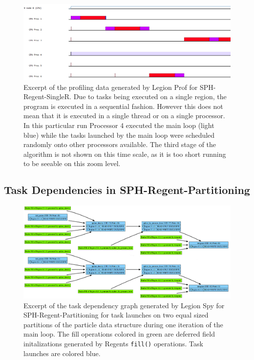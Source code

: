 \documentclass{article}      %
\begin{document}
\begin{appendices}
\begin{landscape}
			\begin{figure}[H]
				\includegraphics[width=0.95\linewidth]{images/SPH-Regent-Partitioning-Prof}
				\caption*{Excerpt of the profiling data generated by Legion Prof for SPH-Regent-SingleR. Due to tasks being executed on a single region, the program is executed in a sequential fashion. However this does not mean that it is executed in a single thread or on a single processor. In this particular run Processor 4 executed the main loop (light blue) while the tasks launched by the main loop were scheduled randomly onto other processors available. The third stage of the algorithm is not shown on this time scale, as it is too short running to be seeable on this zoom level.}
			\end{figure}

		\end{landscape}

		\newpage

		\begin{landscape}
			\section{Task Dependencies in SPH-Regent-Partitioning}
			\label{app:SPH-Regent-Partitioning-SPY}
			\pagestyle{empty}%

			\begin{figure}[H]
				\includegraphics[width=0.95\linewidth]{images/SPH-Regent-Partitioning_SPY}
				\caption*{Excerpt of the task dependency graph generated by Legion Spy for SPH-Regent-Partitioning for task launches on two equal sized partitions of the particle data structure during one iteration of the main loop. The fill operations colored in green are deferred field initalizations generated by Regents \lstinline{fill()} operations. Task launches are colored blue.}
			\end{figure}


\end{landscape}
\end{appendices}
\end{document}
